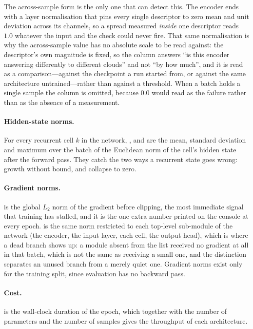The across-sample form is the only one that can detect this. The encoder ends
with a layer normalisation that pins every single descriptor to zero mean and
unit deviation across its channels, so a spread measured \emph{inside} one
descriptor reads $1.0$ whatever the input and the check could never fire.
That same normalisation is why the across-sample value has no absolute scale
to be read against: the descriptor's own magnitude is fixed, so the column
answers ``is this encoder answering differently to different clouds'' and not
``by how much'', and it is read as a comparison---against the checkpoint a run
started from, or against the same architecture untrained---rather than against
a threshold. When a batch holds a single sample the column is omitted, because
$0.0$ would read as the failure rather than as the absence of a measurement.

\paragraph{Hidden-state norms.}
For every recurrent cell $k$ in the network, ,
 and  are the mean,
standard deviation and maximum over the batch of the Euclidean norm of the
cell's hidden state after the forward pass. They catch the two ways a
recurrent state goes wrong: growth without bound, and collapse to zero.

\paragraph{Gradient norms.}
 is the global $L_2$ norm of the gradient before clipping,
the most immediate signal that training has stalled, and it is the one extra
number printed on the console at every epoch.  is the same
norm restricted to each top-level sub-module of the network (the encoder, the
input layer, each cell, the output head), which is where a dead branch shows
up: a module absent from the list received no gradient at all in that batch,
which is not the same as receiving a small one, and the distinction separates
an unused branch from a merely quiet one. Gradient norms exist only for the
training split, since evaluation has no backward pass.

\paragraph{Cost.}
 is the wall-clock duration of the epoch, which together
with the number of parameters and the number of samples gives the throughput
of each architecture.


